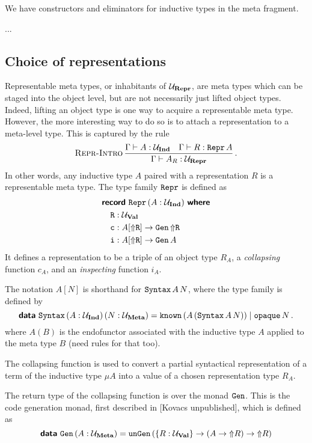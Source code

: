 We have constructors and eliminators for inductive types in the meta fragment.

...

\subsection{Choice of representations}

Representable meta types, or inhabitants of $\Ur$, are meta types which can be
staged into the object level, but are not necessarily just lifted object types.
Indeed, lifting an object type is one way to acquire a representable meta type.
However, the more interesting way to do so is to attach a representation to a
meta-level type. This is captured by the rule
\[
  \infrule[Repr-Intro]{\Gamma \vdash A : \Ui \quad \Gamma \vdash R : \defin{Repr}\,A}
  {\Gamma \vdash A_R : \Ur} \,.
\]
In other words, any inductive type $A$ paired with a representation $R$ is a
representable meta type. The type family $\Repr$ is defined as
\begin{align*}
   & \recordwhere[\,(A: \Ui)]{Repr}                                             \\
   & \quad \defin{R} : \Uv                                                      \\
   & \quad    \defin{c} : A [\lift{\defin R}] \to \Gen \, \lift{\defin R} \quad \\
   & \quad    \defin{i} : A [\lift{\defin R}] \to \Gen \, A
\end{align*}
It defines a representation to be a triple of an object type $R_A$, a
\emph{collapsing} function $c_A$, and an \emph{inspecting} function $i_A$.

The notation $A[N]$ is shorthand for $\defin{Syntax}\,A\,N$, where the
 type family is defined by
\[
  \data{Syntax} \,(A : \Ui)\,(N : \Um) = \defin{known} \, (A\,(\defin{Syntax}\,A\,N)) \mid \defin{opaque} \, N \,.
\]
where $A(B)$ is the endofunctor associated with the inductive type $A$ applied
to the meta type $B$ (need rules for that too).

The collapsing function is used to convert a partial syntactical representation
of a term of the inductive type $\mu A$ into a value of a chosen representation
type $R_A$.

The return type of the collapsing function is over the monad $\Gen$. This is
the code generation monad, first described in [Kovacs unpublished], which is
defined as
\[
  \data{Gen} \, (A : \Um) = \defin{unGen} \, (\{ R : \Uv \} \to (A \to \lift R) \to \lift R)
\]

